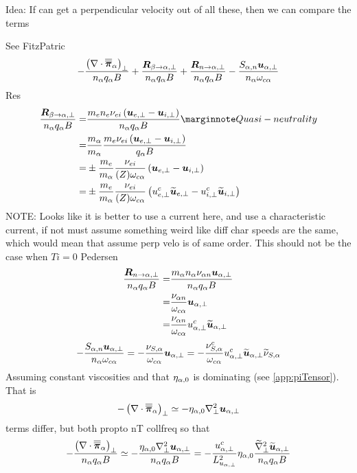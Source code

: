 Idea: If can get a perpendicular velocity out of all these, then we can compare
the terms

See FitzPatric
%
\begin{align*}
- \frac{ \left(\nabla\cdot\boldsymbol{\overline{\overline{\pi}}}_\alpha\right)_\perp }{n_\alpha  q_\alpha B}
+ \frac{ \boldsymbol{R}_{\beta \to \alpha,\perp} }{n_\alpha q_\alpha B}
+ \frac{ \boldsymbol{R}_{n \to \alpha,\perp} }{n_\alpha q_\alpha B}
- \frac{ S_{\alpha,n}\boldsymbol{u}_{\alpha,\perp} }{n_\alpha \omega_{c\alpha}}
\end{align*}
%
Res
%
\begin{align*}
\frac{ \ve{R}_{\beta \to \a,\perp} }{n_\a q_\a B}
=&
\frac{ m_en_e\nu_{ei}\L(\ve{u}_{e,\perp}-\ve{u}_{i,\perp}\R) }{n_\a q_\a B}
\note{Quasi-neutrality}
\\
=&
\frac{m_\a}{m_\a}
\frac{ m_e\nu_{ei}\L(\ve{u}_{e,\perp}-\ve{u}_{i,\perp}\R) }{q_\a B}
\\
=&
\pm
\frac{m_e}{m_\a}
\frac{\nu_{ei} }{(Z) \om_{c\a}}
\L(\ve{u}_{e,\perp}-\ve{u}_{i,\perp}\R)
\\
=&
\pm
\frac{m_e}{m_\a}
\frac{\nu_{ei} }{(Z) \om_{c\a}}
\L(u^c_{e,\perp}\wt{\ve{u}}_{e,\perp}-u^c_{i,\perp}\wt{\ve{u}}_{i,\perp}\R)
\end{align*}
%
NOTE: Looks like it is better to use a current here, and use a characteristic current, if not must assume something weird like diff char speeds are the same, which would mean that assume perp velo is of same order.
This should not be the case when $Ti=0$
Pedersen
%
\begin{align*}
\frac{ \boldsymbol{R}_{n \to \alpha,\perp} }{n_\alpha q_\alpha B}
=&
\frac{ m_\alpha n_\alpha \nu_{\alpha n}\boldsymbol{u}_{\alpha,\perp} }{n_\alpha q_\alpha B}
\\
=&
\frac{\nu_{\alpha n} }{\omega_{c\alpha}}\boldsymbol{u}_{\alpha,\perp}
\\
=&
\frac{\nu_{\alpha n} }{\omega_{c\alpha}}u^c_{\alpha,\perp}\widetilde{ \boldsymbol{u}}_{\alpha,\perp}
\end{align*}
%
\begin{align*}
- \frac{ S_{\alpha,n}\boldsymbol{u}_{\alpha,\perp} }{n_\alpha \omega_{c\alpha}}
=
- \frac{ \nu_{S,\alpha} }{\omega_{c\alpha}}\boldsymbol{u}_{\alpha,\perp}
=
- \frac{ \nu^c_{S,\alpha}}{\omega_{c\alpha}}u^c_{\alpha,\perp}\widetilde{ \boldsymbol{u}}_{\alpha,\perp}
\widetilde{ \nu}_{S,\alpha}
\end{align*}
%
Assuming constant viscosities and that $\eta_{\alpha,0}$ is dominating (see \cref{app:piTensor}).
That is
%
\begin{align*}
-  \left(\nabla\cdot\boldsymbol{\overline{\overline{\pi}}}_\alpha\right)_\perp \simeq
-  \eta_{\alpha,0}\nabla_\perp^2\boldsymbol{u}_{\alpha,\perp}
\end{align*}
%
terms differ, but both propto nT collfreq
so that
%
\begin{align*}
- \frac{ \left(\nabla\cdot\boldsymbol{\overline{\overline{\pi}}}_\alpha\right)_\perp }{n_\alpha  q_\alpha B}
\simeq
- \frac{ \eta_{\alpha,0}\nabla_\perp^2\boldsymbol{u}_{\alpha,\perp} }{n_\alpha  q_\alpha B}
=
- \frac{u^c_{\alpha,\perp}}{L_{u_{\alpha,\perp}}^2}
\eta_{\alpha,0}
\frac{ \widetilde{ \nabla}_\perp^2\widetilde{ \boldsymbol{u}}_{\alpha,\perp} }{n_\alpha  q_\alpha B}
\end{align*}
